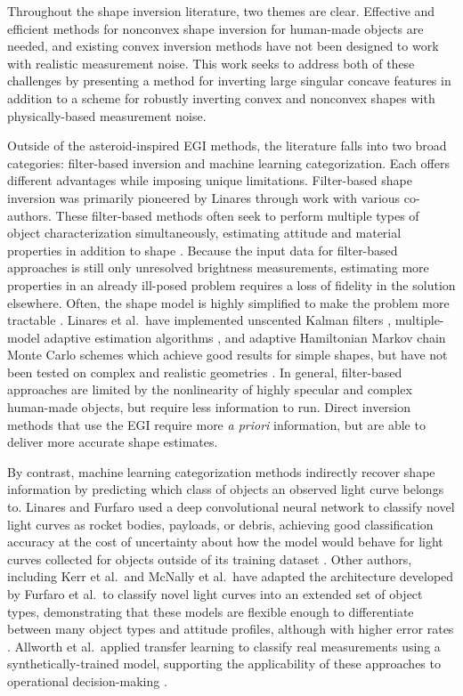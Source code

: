 Throughout the shape inversion literature, two themes are clear. Effective and efficient methods for nonconvex shape inversion for human-made objects are needed, and existing convex inversion methods have not been designed to work with realistic measurement noise. This work seeks to address both of these challenges by presenting a method for inverting large singular concave features in addition to a scheme for robustly inverting convex and nonconvex shapes with physically-based measurement noise.

Outside of the asteroid-inspired EGI methods, the literature falls into two broad categories: filter-based inversion and machine learning categorization. Each offers different advantages while imposing unique limitations. Filter-based shape inversion was primarily pioneered by Linares through work with various co-authors. These filter-based methods often seek to perform multiple types of object characterization simultaneously, estimating attitude and material properties in addition to shape \cite{linares2012, linares2014space, linares2018space}. Because the input data for filter-based approaches is still only unresolved brightness measurements, estimating more properties in an already ill-posed problem requires a loss of fidelity in the solution elsewhere. Often, the shape model is highly simplified to make the problem more tractable \cite{linares2012, linares2014space, linares2018space}. Linares et al.\ have implemented unscented Kalman filters \cite{linares2012}, multiple-model adaptive estimation algorithms \cite{linares2014space}, and adaptive Hamiltonian Markov chain Monte Carlo schemes \cite{linares2018space} which achieve good results for simple shapes, but have not been tested on complex and realistic geometries \cite{linares2018space}. In general, filter-based approaches are limited by the nonlinearity of highly specular and complex human-made objects, but require less information to run. Direct inversion methods that use the EGI require more \textit{a priori} information, but are able to deliver more accurate shape estimates.

By contrast, machine learning categorization methods indirectly recover shape information by predicting which class of objects an observed light curve belongs to. Linares and Furfaro used a deep convolutional neural network to classify novel light curves as rocket bodies, payloads, or debris, achieving good classification accuracy at the cost of uncertainty about how the model would behave for light curves collected for objects outside of its training dataset \cite{linares2016}. Other authors, including Kerr et al.\ and McNally et al.\ have adapted the architecture developed by Furfaro et al.\ to classify novel light curves into an extended set of object types, demonstrating that these models are flexible enough to differentiate between many object types and attitude profiles, although with higher error rates \cite{kerr2021, mcnally2021}. Allworth et al.\ applied transfer learning to classify real measurements using a synthetically-trained model, supporting the applicability of these approaches to operational decision-making \cite{allworth2021}.

